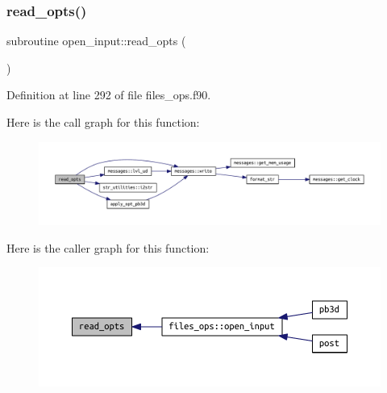 \subsubsection{\texorpdfstring{read\+\_\+opts()}{read\_opts()}}
{\footnotesize\ttfamily subroutine open\+\_\+input\+::read\+\_\+opts (\begin{DoxyParamCaption}{ }\end{DoxyParamCaption})}



Definition at line 292 of file files\+\_\+ops.\+f90.

Here is the call graph for this function\+:
\nopagebreak
\begin{figure}[H]
\begin{center}
\leavevmode
\includegraphics[width=350pt]{files__ops_8f90_ab06139d4caa922a90cef467aa6cf2cba_cgraph}
\end{center}
\end{figure}
Here is the caller graph for this function\+:
\nopagebreak
\begin{figure}[H]
\begin{center}
\leavevmode
\includegraphics[width=350pt]{files__ops_8f90_ab06139d4caa922a90cef467aa6cf2cba_icgraph}
\end{center}
\end{figure}
